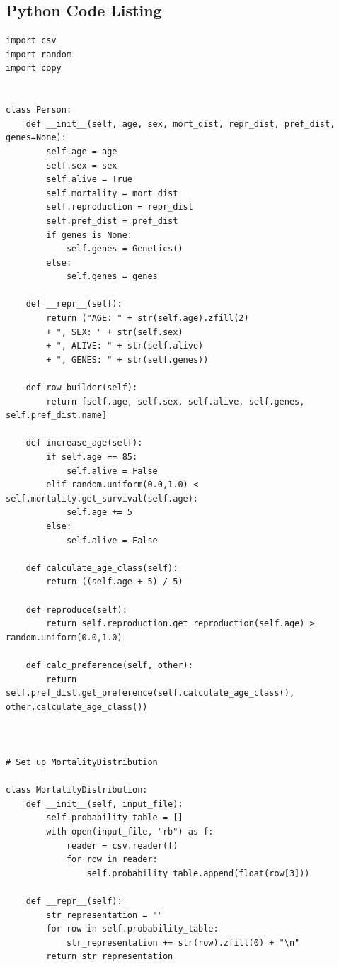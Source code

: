 \documentclass[authoryearcitations]{UoYCSproject}
\begin{document}
\appendix
\begin{landscape}
\chapter{Python Code Listing}
\label{adx:pythonCode}
\pagestyle{plain}
\scriptsize
\begin{verbatim}
import csv
import random
import copy


class Person:
    def __init__(self, age, sex, mort_dist, repr_dist, pref_dist, genes=None):
        self.age = age
        self.sex = sex
        self.alive = True
        self.mortality = mort_dist
        self.reproduction = repr_dist
        self.pref_dist = pref_dist
        if genes is None:
            self.genes = Genetics()
        else:
            self.genes = genes

    def __repr__(self):
        return ("AGE: " + str(self.age).zfill(2)
        + ", SEX: " + str(self.sex)
        + ", ALIVE: " + str(self.alive)
        + ", GENES: " + str(self.genes))

    def row_builder(self):
        return [self.age, self.sex, self.alive, self.genes, self.pref_dist.name]

    def increase_age(self):
        if self.age == 85:
            self.alive = False
        elif random.uniform(0.0,1.0) < self.mortality.get_survival(self.age):
            self.age += 5
        else:
            self.alive = False

    def calculate_age_class(self):
        return ((self.age + 5) / 5)

    def reproduce(self):
        return self.reproduction.get_reproduction(self.age) > random.uniform(0.0,1.0)

    def calc_preference(self, other):
        return self.pref_dist.get_preference(self.calculate_age_class(), other.calculate_age_class())



# Set up MortalityDistribution

class MortalityDistribution:
    def __init__(self, input_file):
        self.probability_table = []
        with open(input_file, "rb") as f:
            reader = csv.reader(f)
            for row in reader:
                self.probability_table.append(float(row[3]))

    def __repr__(self):
        str_representation = ""
        for row in self.probability_table:
            str_representation += str(row).zfill(0) + "\n"
        return str_representation


\end{verbatim}
\end{landscape}
\end{document}
